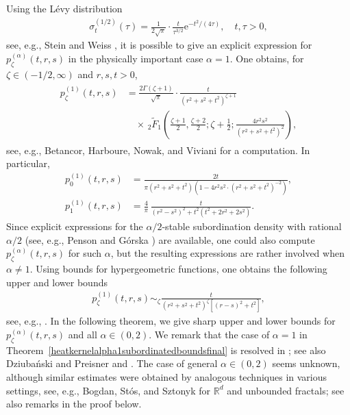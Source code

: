 \documentclass[12pt,reqno,a4paper]{amsart}
\theoremstyle{definition}
\theoremstyle{remark}
\numberwithin{equation}{section}
\newcommand{\1}{\mathbbm{1}}
\def\Rd{{\mathbb{R}^d}}
\newcommand{\me}[1]{\mathrm{e}^{#1}}
\begin{document}
Using the L\'evy distribution
\begin{align}
  \label{eq:subordinatorexplicitalpha1}
  \sigma_t^{(1/2)}(\tau)
  = \frac{1}{2\sqrt\pi}\cdot \frac{t}{\tau^{3/2}}\me{-t^2/(4\tau)},
  \quad t,\tau>0,
\end{align}
see, e.g., Stein and Weiss \cite[p.~6]{SteinWeiss1971}, it is possible to give an explicit expression for $p_\zeta^{(\alpha)}(t,r,s)$ in the physically important case $\alpha=1$. One obtains, for $\zeta\in(-1/2,\infty)$ and $r,s,t>0$,
\begin{align}
  \label{eq:heatkernell}
  \begin{split}
    p_\zeta^{(1)}(t,r,s)
    & = \frac{2\Gamma(\zeta+1)}{\sqrt\pi} \cdot \frac{t}{\left(r^2+s^2+t^2\right)^{\zeta+1}} \\
      & \quad \times\, _2\tilde{F}_1\left(\frac{\zeta+1}{2},\frac{\zeta+2}{2};\zeta+\frac{1}{2};\frac{4r^2s^2}{\left(r^2+s^2+t^2\right)^2}\right),
  \end{split}
\end{align}
see, e.g., Betancor, Harboure, Nowak, and Viviani \cite[p.~136]{Betancoretal2010} for a computation. In particular,
\begin{subequations}
  \label{eq:heatkernell0}
  \begin{align}
    p_0^{(1)}(t,r,s) & = \frac{2 t}{\pi  \left(r^2+s^2+t^2\right) \left(1- 4 r^2 s^2 \cdot \left(r^2+s^2+t^2\right)^{-2}\right)}, \\
    p_1^{(1)}(t,r,s) & = \frac{4}{\pi}\, \frac{t}{(r^2-s^2)^2+t^2(t^2+2r^2+2s^2)}.
  \end{align}
\end{subequations}
Since explicit expressions for the $\alpha/2$-stable subordination density with rational $\alpha/2$ (see, e.g., Penson and G\'orska \cite{PensonGorska2010}) are available, one could also compute $p_\zeta^{(\alpha)}(t,r,s)$ for such $\alpha$, but  
the resulting expressions are rather involved when $\alpha\neq1$.
Using bounds for hypergeometric functions, one obtains the following upper and lower bounds 
\begin{align}
  p_\zeta^{(1)}(t,r,s) \sim_\zeta \frac{t}{(r^2+s^2+t^2)^\zeta [(r-s)^2+t^2]},
\end{align}
see, e.g., \cite[Proposition~6.1]{Betancoretal2010}.
In the following theorem, we give sharp upper and lower bounds for $p_\zeta^{(\alpha)}(t,r,s)$ and all $\alpha\in(0,2)$.
We remark that the case of $\alpha=1$ in Theorem~\ref{heatkernelalpha1subordinatedboundsfinal} is resolved in \cite[Proposition~6.1]{Betancoretal2010}; see also Dziuba\'{n}ski and Preisner \cite[Proposition~6]{DziubanskiPreisner2018} and \cite{Betancoretal2014}. The case of general $\alpha\in (0,2)$ seems unknown, although similar estimates were obtained by analogous techniques in various settings, see, e.g., Bogdan, St\'{o}s, and Sztonyk \cite[Theorem~3.1]{Bogdanetal2003H} for $\Rd$ and unbounded fractals; see also remarks in the proof below. 
\end{document}
